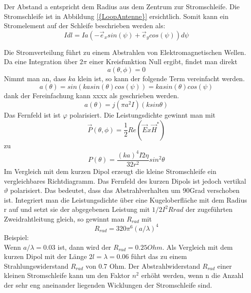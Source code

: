 Der Abstand  a entspricht dem Radius  aus dem Zentrum zur Stromschleife. Die Stromschleife ist in  Abbildung \ref{{LoopAntenne}} ersichtlich. Somit kann ein Stromelement auf der Schleife beschrieben werden als:
\begin{equation}
I dl= Ia(- \vec e_{x}sin(\psi)+\vec e_{y}cos(\psi))d\psi
\end{equation}
 
Die Stromverteilung führt zu einem Abstrahlen von Elektromagnetischen Wellen.
Da eine Integration über $2\pi $ einer Kreisfunktion Null ergibt, findet man direkt 
\begin{equation}
a(\theta, \phi) =0
\end{equation}
Nimmt man  an, dass $ka$ klein ist, so kann der folgende Term vereinfacht werden.
\begin{equation}
a(\theta)=sin(ka sin(\theta)cos(\psi))=ka sin(\theta)cos(\psi)
\end{equation}
dank der Fereinfachung kann xxxx als geschrieben werden.
\begin{equation}
a(\theta)=j(\pi a^{2}I)(k sin \theta)
\end{equation}
Das Fernfeld ist  ist  $\varphi$ polarisiert.  Die Leistungsdichte gewinnt man mit 
\begin{equation}
\vec P(\theta,\phi)=\frac{1}{2}Re(\vec E x \vec H^*)
\end{equation}
zu
\begin{equation}
P(\theta)=\frac{(ka)^{4}I{2}\eta}{32r^{2}}sin^{2}\theta
\end{equation}
Im Vergleich mit dem kurzen Dipol erzeugt die kleine Stromschleife ein vergleichbares Richtdiagramm. Das Fernfeld des kurzen Dipols ist jedoch vertikal $\vartheta$ polarisiert. Das bedeutet, dass das Abstrahlverhalten um 90Grad verschoben ist. Integriert man die Leistungsdichte über eine Kugeloberfläche mit dem Radius r  auf und setzt sie der abgegebenen Leistung mit $1/2 I^{2}Rrad $ der zugeführten Zweidrahtleitung gleich, so gewinnt man $R_{rad}$ mit 
\begin{equation}
R_{rad} = 320\pi^{6} (a/\lambda)^{4}\label{eq:RradLoop}
\end{equation}
Beispiel:\\
Wenn $a/\lambda = 0.03$ ist, dann wird der $R_{rad} = 0.25 Ohm$. Als Vergleich mit dem kurzen Dipol mit der Länge $2l=\lambda= 0.06$ führt das zu einem Strahlungswiderstand $R_{rad}$ von 0.7 Ohm.  Der Abstrahlwiderstand $R_{rad}$ einer kleinen Stromschleife kann um den Faktor $n^{2}$ erhöht werden, wenn n die Anzahl der sehr eng aneinander liegenden Wicklungen der Stromschleife sind. 



